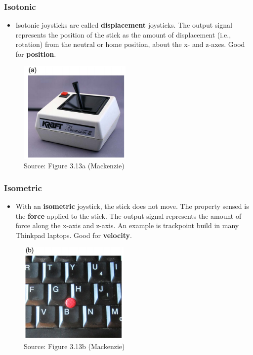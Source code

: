 \documentclass{beamer}
\begin{document}
\begin{frame}
	\frametitle{Isotonic}
	\begin{itemize}
		\item Isotonic joysticks are called \textbf{displacement} joysticks. The output signal represents the position of the stick as the amount of displacement (i.e., rotation) from the neutral or home position, about the x- and z-axes.  Good for \textbf{position}.
	\end{itemize}
	\begin{figure}
		\includegraphics[width=0.4\linewidth]{image/3-13a}
		\caption{Source: Figure 3.13a (Mackenzie)}
	\end{figure}
\end{frame}

\begin{frame}
	\frametitle{Isometric}
	\begin{itemize}
		\item With an \textbf{isometric} joystick, the stick does not move. The property sensed is the \textbf{force} applied to the stick. The output signal represents the amount of force along the x-axis and z-axis. An example is trackpoint build in many Thinkpad laptops.  Good for \textbf{velocity}.
	\end{itemize}
	\begin{figure}
		\includegraphics[width=0.35\linewidth]{image/3-13b}
		\caption{Source: Figure 3.13b (Mackenzie)}
	\end{figure}
\end{frame}
\end{document}
